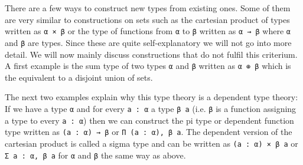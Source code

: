 There are a few ways to construct new types from existing ones. 
Some of them are very similar to constructions on sets such as the cartesian product of types written as \lstinline{α × β} or the type of functions from \lstinline{α} to \lstinline{β} written as \lstinline{α → β} where \lstinline{α} and \lstinline{β} are types.
Since these are quite self-explanatory we will not go into more detail.
We will now mainly discuss constructions that do not fulfil this criterium. 
A first example is the sum type of two types \lstinline{α} and \lstinline{β} written as \lstinline{α ⊕ β} which is the equivalent to a disjoint union of sets. 

The next two examples explain why this type theory is a dependent type theory:
If we have a type \lstinline{α} and for every \lstinline{a : α} a type \lstinline{β a} (i.e. \lstinline{β} is a function assigning a type to every \lstinline{a : α}) then we can construct the pi type or dependent function type written as \lstinline{(a : α) → β} or \lstinline{Π (a : α), β a}. 
The dependent version of the cartesian product is called a sigma type and can be written as \lstinline{(a : α) × β a} or \lstinline{Σ a : α, β a} for \lstinline{α} and \lstinline{β} the same way as above.